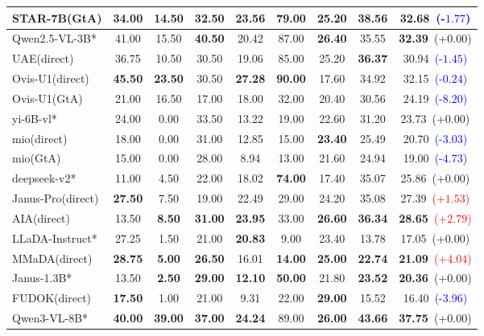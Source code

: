 \documentclass{article}
\providecommand{\rowcolor}[1]{}
\theoremstyle{plain}
\theoremstyle{definition}
\theoremstyle{remark}
\begin{document}
\begin{table}[!t]
{\begin{tabular}{@{}lcccccccc@{}}
STAR-7B(GtA) & 34.00 & 14.50 & 32.50 & 23.56 & 79.00 & 25.20 & 38.56 & 32.68~\textcolor{blue}{(-$1.77$)} \\
\midrule
\rowcolor{gray!12}
Qwen2.5-VL-3B* & 41.00 & 15.50 & \textbf{40.50} & 20.42 & 87.00 & \textbf{26.40} & 35.55 & \textbf{32.39}~(+$0.00$) \\
UAE(direct) & 36.75 & 10.50 & 30.50 & 19.06 & 85.00 & 25.20 & \textbf{36.37} & 30.94~\textcolor{blue}{(-$1.45$)} \\
Ovis-U1(direct) & \textbf{45.50} & \textbf{23.50} & 30.50 & \textbf{27.28} & \textbf{90.00} & 17.60 & 34.92 & 32.15~\textcolor{blue}{(-$0.24$)} \\
Ovis-U1(GtA) & 21.00 & 16.50 & 17.00 & 18.00 & 32.00 & 20.40 & 30.56 & 24.19~\textcolor{blue}{(-$8.20$)} \\
\midrule
\rowcolor{gray!12}
yi-6B-vl* & 24.00 & 0.00 & 33.50 & 13.22 & 19.00 & 22.60 & 31.20 & 23.73~(+$0.00$) \\
mio(direct) & 18.00 & 0.00 & 31.00 & 12.85 & 15.00 & \textbf{23.40} & 25.49 & 20.70~\textcolor{blue}{(-$3.03$)} \\
mio(GtA) & 15.00 & 0.00 & 28.00 & 8.94 & 13.00 & 21.60 & 24.94 & 19.00~\textcolor{blue}{(-$4.73$)} \\
\midrule
\rowcolor{gray!12}
deepseek-v2* & 11.00 & 4.50 & 22.00 & 18.02 & \textbf{74.00} & 17.40 & 35.07 & 25.86~(+$0.00$) \\
Janus-Pro(direct) & \textbf{27.50} & 7.50 & 19.00 & 22.49 & 29.00 & 24.20 & 35.08 & 27.39~\textcolor{red}{(+$1.53$)} \\
AIA(direct) & 13.50 & \textbf{8.50} & \textbf{31.00} & \textbf{23.95} & 33.00 & \textbf{26.60} & \textbf{36.34} & \textbf{28.65}~\textcolor{red}{(+$2.79$)} \\
\midrule
\rowcolor{gray!12}
LLaDA-Instruct* & 27.25 & 1.50 & 21.00 & \textbf{20.83} & 9.00 & 23.40 & 13.78 & 17.05~(+$0.00$) \\
MMaDA(direct) & \textbf{28.75} & \textbf{5.00} & \textbf{26.50} & 16.01 & \textbf{14.00} & \textbf{25.00} & \textbf{22.74} & \textbf{21.09}~\textcolor{red}{(+$4.04$)} \\
\midrule
\rowcolor{gray!12}
Janus-1.3B* & 13.50 & \textbf{2.50} & \textbf{29.00} & \textbf{12.10} & \textbf{50.00} & 21.80 & \textbf{23.52} & \textbf{20.36}~(+$0.00$) \\
FUDOK(direct) & \textbf{17.50} & 1.00 & 21.00 & 9.31 & 22.00 & \textbf{29.00} & 15.52 & 16.40~\textcolor{blue}{(-$3.96$)} \\
\midrule
\rowcolor{gray!12}
Qwen3-VL-8B* & \textbf{40.00} & \textbf{39.00} & \textbf{37.00} & \textbf{24.24} & 89.00 & \textbf{26.00} & \textbf{43.66} & \textbf{37.75}~(+$0.00$) \\

\end{tabular}}
\end{table}
\end{document}
